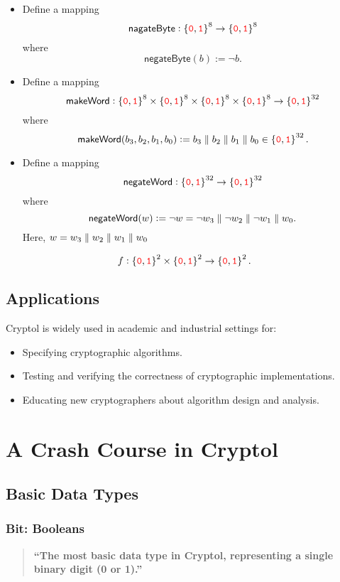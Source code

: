 \begin{itemize}
	\item Define a mapping $$\mathsf{nagateByte}:\binaryfield^{8}\to\binaryfield^{8}$$ where \[
	\mathsf{negateByte}(b):=\lnot b.
	\]
	\item Define a mapping $$\mathsf{makeWord}:\binaryfield^{8}\times\binaryfield^{8}\times \binaryfield^{8}\times \binaryfield^{8}\to\binaryfield^{32}$$ where \[
	\mathsf{makeWord}(b_3,b_2,b_1,b_0):=b_3\adjacent b_2\adjacent b_1\adjacent b_0\in\binaryfield^{32}.
	\]
	\item Define a mapping $$\mathsf{negateWord}:\binaryfield^{32}\to\binaryfield^{32}$$ where \[
	\mathsf{negateWord}(w):=\lnot w=\lnot w_3\adjacent \lnot w_2\adjacent \lnot w_1\adjacent w_0.
	\] Here, $w=w_3\adjacent w_2\adjacent w_1\adjacent w_0$
\end{itemize}

\[
f:\binaryfield^2\times\binaryfield^2\to\binaryfield^2.
\]
\section*{Applications}
Cryptol is widely used in academic and industrial settings for:
\begin{itemize}
	\item Specifying cryptographic algorithms.
	\item Testing and verifying the correctness of cryptographic implementations.
	\item Educating new cryptographers about algorithm design and analysis.
\end{itemize}

\chapter{A Crash Course in Cryptol}

\section{Basic Data Types}

\subsection{Bit: Booleans}
\begin{quote}\bf
	``The most basic data type in Cryptol, representing a single binary digit (0 or 1).''
\end{quote}

